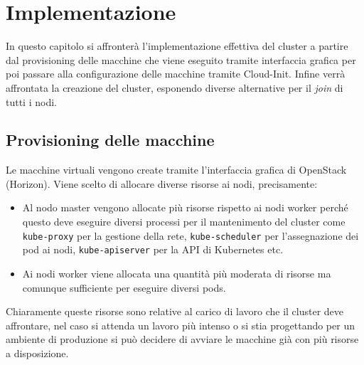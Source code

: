 \documentclass[12pt,a4paper,openright,twoside]{book}
\begin{document}
\chapter{Implementazione}
In questo capitolo si affronterà l'implementazione effettiva del cluster a partire dal provisioning delle macchine che viene eseguito tramite interfaccia grafica
per poi passare alla configurazione delle macchine tramite Cloud-Init. Infine verrà affrontata la creazione del cluster, esponendo diverse alternative per il \textit{join}
di tutti i nodi.
\section{Provisioning delle macchine}
Le macchine virtuali vengono create tramite l'interfaccia grafica di OpenStack (Horizon). Viene scelto di allocare diverse risorse ai nodi, precisamente: 
\begin{itemize}
    \item Al nodo master vengono allocate più risorse rispetto ai nodi worker perché questo deve eseguire diversi processi per il mantenimento del cluster
        come \texttt{kube-proxy} per la gestione della rete, \texttt{kube-scheduler} per l'assegnazione dei pod ai nodi, \texttt{kube-apiserver} per la API di Kubernetes etc.
    \item Ai nodi worker viene allocata una quantità più moderata di risorse ma comunque sufficiente per eseguire diversi pods. 
\end{itemize}
Chiaramente queste risorse sono relative al carico di lavoro che il cluster deve affrontare, nel caso si attenda un lavoro più intenso o si stia progettando per un ambiente di produzione
si può decidere di avviare le macchine già con più risorse a disposizione.
\end{document}
